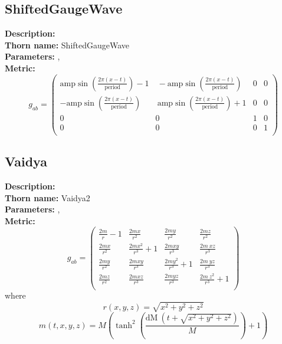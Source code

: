 \subsection{ShiftedGaugeWave}
{\bf Description:}   \\
{\bf Thorn name:} ShiftedGaugeWave \\
{\bf Parameters:} ,  \\
{\bf Metric:} \\
\begin{equation}
g_{ab} = 
\left(
\begin{array}{cccc}
 \text{amp} \sin \left(\frac{2 \pi  (x-t)}{\text{period}}\right)-1 & \
-\text{amp} \sin \left(\frac{2 \pi  (x-t)}{\text{period}}\right) & 0 & 0 \\
 -\text{amp} \sin \left(\frac{2 \pi  (x-t)}{\text{period}}\right) & \
\text{amp} \sin \left(\frac{2 \pi  (x-t)}{\text{period}}\right)+1 & 0 & 0 \\
 0 & 0 & 1 & 0 \\
 0 & 0 & 0 & 1 \\
\end{array}
\right)
\end{equation}


\subsection{Vaidya}
{\bf Description:}   \\
{\bf Thorn name:} Vaidya2 \\
{\bf Parameters:} ,  \\
{\bf Metric:} \\
\begin{equation}
g_{ab} = 
\left(
\begin{array}{cccc}
 \frac{2 m}{r}-1 & \frac{2 m x}{r^2} & \frac{2 m y}{r^2} & \frac{2 m z}{r^2} \
\\
 \frac{2 m x}{r^2} & \frac{2 m x^2}{r^3}+1 & \frac{2 m x y}{r^3} & \frac{2 m \
x z}{r^3} \\
 \frac{2 m y}{r^2} & \frac{2 m x y}{r^3} & \frac{2 m y^2}{r^3}+1 & \frac{2 m \
y z}{r^3} \\
 \frac{2 m z}{r^2} & \frac{2 m x z}{r^3} & \frac{2 m y z}{r^3} & \frac{2 m \
z^2}{r^3}+1 \\
\end{array}
\right)
\end{equation}
where
\begin{equation}
r(x,y,z)=\sqrt{x^2+y^2+z^2}
\end{equation}
\begin{equation}
m(t,x,y,z)=M \left(\tanh ^2\left(\frac{\text{dM} \
\left(t+\sqrt{x^2+y^2+z^2}\right)}{M}\right)+1\right)
\end{equation}



